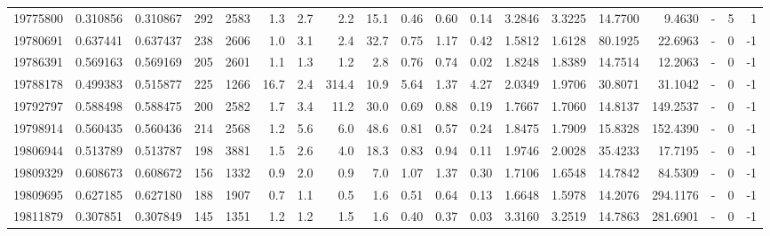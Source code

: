 \begin{tabular}{rrrrrrrrrrrrrrrrlrr}
  19775800 & 0.310856 &   0.310867 &  292 & 2583 &      1.3 &      2.7 &     2.2 &     15.1 &       0.46 &        0.60 &        0.14 &  3.2846 &  3.3225 &   14.7700 &    9.4630 &             - &        5 &          1 \\
  19780691 & 0.637441 &   0.637437 &  238 & 2606 &      1.0 &      3.1 &     2.4 &     32.7 &       0.75 &        1.17 &        0.42 &  1.5812 &  1.6128 &   80.1925 &   22.6963 &             - &        0 &         -1 \\
  19786391 & 0.569163 &   0.569169 &  205 & 2601 &      1.1 &      1.3 &     1.2 &      2.8 &       0.76 &        0.74 &        0.02 &  1.8248 &  1.8389 &   14.7514 &   12.2063 &             - &        0 &         -1 \\
  19788178 & 0.499383 &   0.515877 &  225 & 1266 &     16.7 &      2.4 &   314.4 &     10.9 &       5.64 &        1.37 &        4.27 &  2.0349 &  1.9706 &   30.8071 &   31.1042 &             - &        0 &         -1 \\
  19792797 & 0.588498 &   0.588475 &  200 & 2582 &      1.7 &      3.4 &    11.2 &     30.0 &       0.69 &        0.88 &        0.19 &  1.7667 &  1.7060 &   14.8137 &  149.2537 &             - &        0 &         -1 \\
  19798914 & 0.560435 &   0.560436 &  214 & 2568 &      1.2 &      5.6 &     6.0 &     48.6 &       0.81 &        0.57 &        0.24 &  1.8475 &  1.7909 &   15.8328 &  152.4390 &             - &        0 &         -1 \\
  19806944 & 0.513789 &   0.513787 &  198 & 3881 &      1.5 &      2.6 &     4.0 &     18.3 &       0.83 &        0.94 &        0.11 &  1.9746 &  2.0028 &   35.4233 &   17.7195 &             - &        0 &         -1 \\
  19809329 & 0.608673 &   0.608672 &  156 & 1332 &      0.9 &      2.0 &     0.9 &      7.0 &       1.07 &        1.37 &        0.30 &  1.7106 &  1.6548 &   14.7842 &   84.5309 &             - &        0 &         -1 \\
  19809695 & 0.627185 &   0.627180 &  188 & 1907 &      0.7 &      1.1 &     0.5 &      1.6 &       0.51 &        0.64 &        0.13 &  1.6648 &  1.5978 &   14.2076 &  294.1176 &             - &        0 &         -1 \\
  19811879 & 0.307851 &   0.307849 &  145 & 1351 &      1.2 &      1.2 &     1.5 &      1.6 &       0.40 &        0.37 &        0.03 &  3.3160 &  3.2519 &   14.7863 &  281.6901 &             - &        0 &         -1 \\

\end{tabular}
